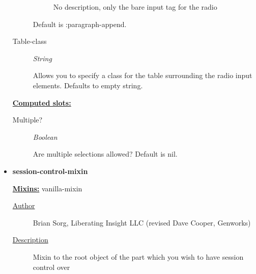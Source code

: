 \documentclass [11pt]{book}
\begin{document}
\begin{itemize}
\begin{description}
\begin{description}
No description, only the bare input tag for the radio

\end{description}


Default is :paragraph-append.




\item [Table-class]
\emph{String}

 Allows you to specify a class for the table surrounding the radio input elements. Defaults to empty string.




\end{description}






\textbf{
\underline{Computed slots:}}

\begin{description}

\item [Multiple?]
\emph{Boolean}

 Are multiple selections allowed? Default is nil.




\end{description}







\item {}
\label{prim:session-control-mixin}
\textbf{session-control-mixin}


\textbf{
\underline{Mixins:}} vanilla-mixin





\begin{description}

\item [
\underline{Author}]


Brian Sorg, Liberating Insight LLC (revised Dave Cooper, Genworks)



\item [
\underline{Description}]


Mixin to the root object of the part which you wish to have session control over



\end{description}









\end{itemize}
\end{document}
